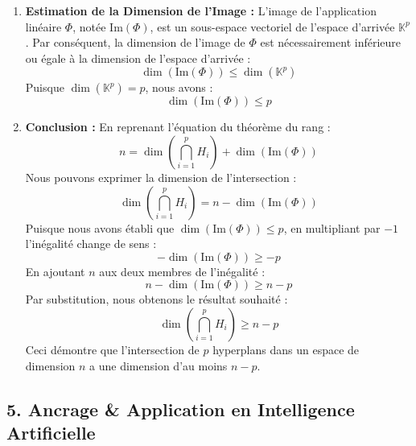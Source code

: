 \documentclass[11pt,a4paper]{report}
\begin{document}
\begin{enumerate}
\item
  \textbf{Estimation de la Dimension de l'Image :} L'image de
  l'application linéaire \(\Phi\), notée \(\text{Im}(\Phi)\), est un
  sous-espace vectoriel de l'espace d'arrivée \(\mathbb{K}^p\). Par
  conséquent, la dimension de l'image de \(\Phi\) est nécessairement
  inférieure ou égale à la dimension de l'espace d'arrivée :
  \[ \dim(\text{Im}(\Phi)) \le \dim(\mathbb{K}^p) \] Puisque
  \(\dim(\mathbb{K}^p) = p\), nous avons :
  \[ \dim(\text{Im}(\Phi)) \le p \]
\item
  \textbf{Conclusion :} En reprenant l'équation du théorème du rang :
  \[ n = \dim\left(\bigcap_{i=1}^p H_i\right) + \dim(\text{Im}(\Phi)) \]
  Nous pouvons exprimer la dimension de l'intersection :
  \[ \dim\left(\bigcap_{i=1}^p H_i\right) = n - \dim(\text{Im}(\Phi)) \]
  Puisque nous avons établi que \(\dim(\text{Im}(\Phi)) \le p\), en
  multipliant par \(-1\) l'inégalité change de sens :
  \[ -\dim(\text{Im}(\Phi)) \ge -p \] En ajoutant \(n\) aux deux membres
  de l'inégalité : \[ n - \dim(\text{Im}(\Phi)) \ge n - p \] Par
  substitution, nous obtenons le résultat souhaité :
  \[ \dim\left(\bigcap_{i=1}^p H_i\right) \ge n - p \] Ceci démontre que
  l'intersection de \(p\) hyperplans dans un espace de dimension \(n\) a
  une dimension d'au moins \(n-p\).
\end{enumerate}

\hypertarget{ancrage-application-en-intelligence-artificielle}{%
\subsection{5. Ancrage \& Application en Intelligence
Artificielle}\label{ancrage-application-en-intelligence-artificielle}}
\end{document}
